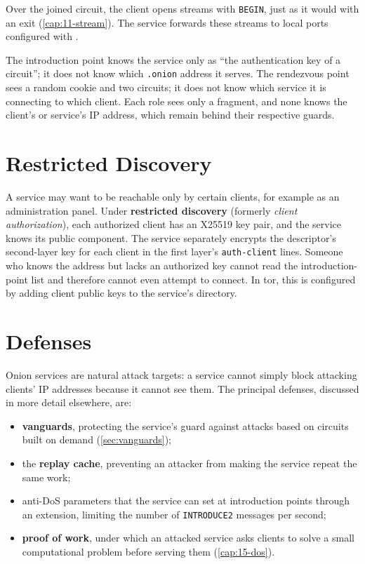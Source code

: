 Over the joined circuit, the client opens streams with \texttt{BEGIN}, just as it would with an exit (\cref{cap:11-stream}). The service forwards these streams to local ports configured with .

\begin{approfondimento}
The introduction point knows the service only as \enquote{the authentication key of a circuit}; it does not know which \texttt{.onion} address it serves. The rendezvous point sees a random cookie and two circuits; it does not know which service it is connecting to which client. Each role sees only a fragment, and none knows the client's or service's IP address, which remain behind their respective guards.
\end{approfondimento}

\section{Restricted Discovery}\label{sec:os-ristretta}

A service may want to be reachable only by certain clients, for example as an administration panel. Under \textbf{restricted discovery} (formerly \emph{client authorization}), each authorized client has an X25519 key pair, and the service knows its public component. The service separately encrypts the descriptor's second-layer key for each client in the first layer's \texttt{auth-client} lines. Someone who knows the address but lacks an authorized key cannot read the introduction-point list and therefore cannot even attempt to connect. In tor, this is configured by adding client public keys to the service's  directory.

\section{Defenses}\label{sec:os-difese}

Onion services are natural attack targets: a service cannot simply block attacking clients' IP addresses because it cannot see them. The principal defenses, discussed in more detail elsewhere, are:
\begin{itemize}
  \item \textbf{vanguards}, protecting the service's guard against attacks based on circuits built on demand (\cref{sec:vanguards});
  \item the \textbf{replay cache}, preventing an attacker from making the service repeat the same work;
  \item anti-DoS parameters that the service can set at introduction points through an  extension, limiting the number of \texttt{INTRODUCE2} messages per second;
  \item \textbf{proof of work}, under which an attacked service asks clients to solve a small computational problem before serving them (\cref{cap:15-dos}).
\end{itemize}

